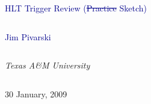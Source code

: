 \documentclass[compress]{beamer}
\begin{document}
\begin{frame}
\vfill
\begin{center}
\textcolor{darkblue}{\Large HLT Trigger Review (\sout{Practice} Sketch)}

\vfill
\begin{columns}
\begin{center}
\large
\textcolor{darkblue}{Jim Pivarski}
\end{center}
\end{columns}

\begin{columns}
\begin{center}
\scriptsize
{\it Texas A\&M University}
\end{center}
\end{columns}

\vfill
30 January, 2009

\end{center}
\end{frame}


\small
\end{document}
